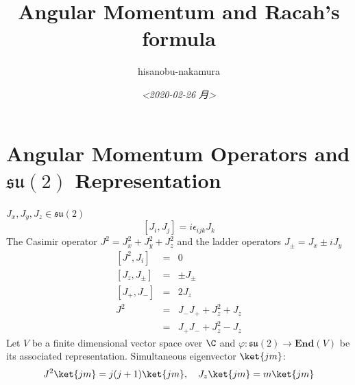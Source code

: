 \documentclass{article}
\author{hisanobu-nakamura}
\date{\textit{<2020-02-26 月>}}
\title{Angular Momentum and Racah's formula}
\begin{document}
\maketitle




\section{Angular Momentum Operators and $\mathfrak{su}(2)$ Representation}
\label{sec-1}
$J_x,J_y,J_z \in \mathfrak{su}(2)$
\begin{equation}
\label{}
[J_i,J_j] = i\epsilon_{ijk}J_k
\end{equation}
The Casimir operator $J ^2 = J_x^2 + J_y^2 + J_z^2$ and the ladder operators $J_{\pm}=J_x\pm iJ_y$
\begin{eqnarray}
\left[J^2,J_i\right] &=& 0\\
\left[J_z,J_{\pm}\right] & = & \pm J_{\pm} \\
\left[ J_+,J_- \right] &=& 2J_z\\
J^2 & = & J_-J_+ +J_z^2 + J_z \\
    &=& J_+J_- +J_z^2 - J_z 
\end{eqnarray}
Let $V$ be a finite dimensional vector space over $\C$ and $\varphi:\mathfrak{su}(2) \rightarrow \mathbf{End}(V)$ be its associated representation. Simultaneous eigenvector $\ket{jm}$:
\begin{equation}
\label{}
J^2\ket{jm} = j(j+1)\ket{jm}, \quad J_z\ket{jm} = m\ket{jm}
\end{equation}
\end{document}
